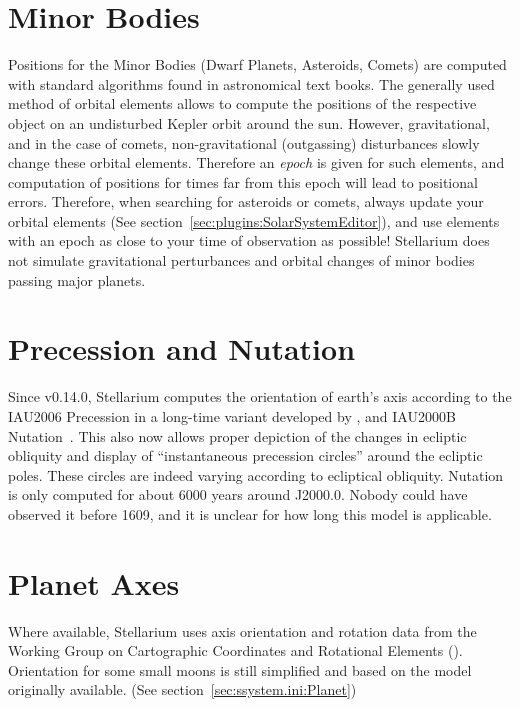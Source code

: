 \section{Minor Bodies}
\label{sec:Accuracy:MinorBodies}

Positions for the Minor Bodies (Dwarf Planets, Asteroids, Comets) are
computed with standard algorithms found in astronomical text
books. The generally used method of orbital elements allows to compute
the positions of the respective object on an undisturbed Kepler orbit
around the sun. However, gravitational, and in the case of comets,
non-gravitational (outgassing) disturbances slowly change these
orbital elements. Therefore an \emph{epoch} is given for such
elements, and computation of positions for times far from this epoch
will lead to positional errors. Therefore, when searching for
asteroids or comets, always update your orbital elements (See section~\ref{sec:plugins:SolarSystemEditor}), 
and use elements with an epoch as close to your time of observation as
possible! Stellarium does not simulate gravitational perturbances and
orbital changes of minor bodies passing major planets.

\section{Precession and Nutation}
\label{sec:Accuracy:Precession}

Since v0.14.0, Stellarium computes the orientation of earth's axis
according to the IAU2006 Precession in a long-time variant developed
by \citet{2011AA:Vondrak, 2012AA:Vondrak}, and IAU2000B Nutation~\citep{Nutation:IAU2000B}.
This also now allows proper depiction of the changes in ecliptic obliquity
and display of ``instantaneous precession circles'' around the
ecliptic poles. These circles are indeed varying according to
ecliptical obliquity. Nutation is only computed for about 6000 years
around J2000.0. Nobody could have observed it before 1609, and it is
unclear for how long this model is applicable.

\section{Planet Axes}
\label{sec:Accuracy:PlanetAxes}

Where available, Stellarium uses  axis orientation
and rotation data from the  Working Group on
Cartographic Coordinates and Rotational Elements ().
Orientation for some small moons is still simplified and
based on the model originally available. (See section~\ref{sec:ssystem.ini:Planet})

